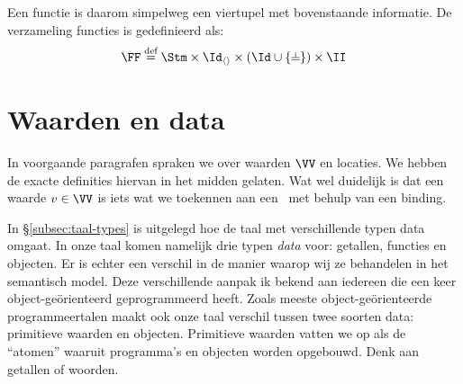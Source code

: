 Een functie is daarom simpelweg een viertupel met bovenstaande informatie. De verzameling functies is gedefinieerd als:
\begin{equation*}
  \FF \DEF \Stm \times \Id_{\langle\rangle} \times (\Id \cup \{\nil\}) \times \II
\end{equation*}

\section{Waarden en data}
\label{sec:waarden}

In voorgaande paragrafen spraken we over waarden $\VV$ en locaties. We hebben de exacte definities hiervan in het midden gelaten. Wat wel duidelijk is dat een waarde $v \in \VV$ is iets wat we toekennen aan een \Id\ met behulp van een binding.

In §\ref{subsec:taal-types} is uitgelegd hoe de taal met verschillende typen data omgaat. In onze taal komen namelijk drie typen \emph{data} voor: getallen, functies en objecten. Er is echter een verschil in de manier waarop wij ze behandelen in het semantisch model. Deze verschillende aanpak ik bekend aan iedereen die een keer object-geörienteerd geprogrammeerd heeft.
Zoals meeste object-geörienteerde programmeertalen maakt ook onze taal verschil tussen twee soorten data: primitieve waarden en objecten. Primitieve waarden vatten we op als de “atomen” waaruit programma's en objecten worden opgebouwd. Denk aan getallen of woorden.

\begin{NoBreak}
  \codeFragmentCaption
\end{NoBreak}

